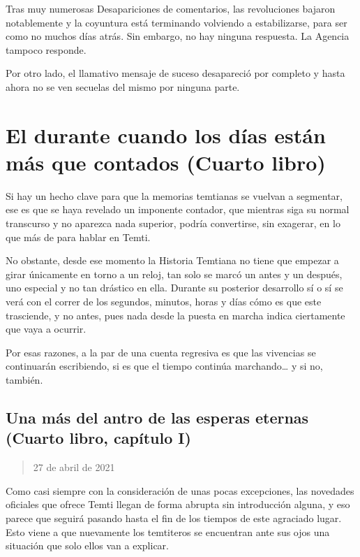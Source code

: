 \documentclass[
  spanish,
]{book}
\begin{document}
Tras muy numerosas Desapariciones de comentarios, las revoluciones bajaron notablemente y la coyuntura está terminando volviendo a estabilizarse, para ser como no muchos días atrás. Sin embargo, no hay ninguna respuesta. La Agencia tampoco responde.

Por otro lado, el llamativo mensaje de suceso desapareció por completo y hasta ahora no se ven secuelas del mismo por ninguna parte.

\hypertarget{el-durante-cuando-los-duxedas-estuxe1n-muxe1s-que-contados-cuarto-libro}{%
\chapter{El durante cuando los días están más que contados (Cuarto libro)}\label{el-durante-cuando-los-duxedas-estuxe1n-muxe1s-que-contados-cuarto-libro}}

Si hay un hecho clave para que la memorias temtianas se vuelvan a segmentar, ese es que se haya revelado un imponente contador, que mientras siga su normal transcurso y no aparezca nada superior, podría convertirse, sin exagerar, en lo que más de para hablar en Temti.

No obstante, desde ese momento la Historia Temtiana no tiene que empezar a girar únicamente en torno a un reloj, tan solo se marcó un antes y un después, uno especial y no tan drástico en ella. Durante su posterior desarrollo sí o sí se verá con el correr de los segundos, minutos, horas y días cómo es que este trasciende, y no antes, pues nada desde la puesta en marcha indica ciertamente que vaya a ocurrir.

Por esas razones, a la par de una cuenta regresiva es que las vivencias se continuarán escribiendo, si es que el tiempo continúa marchando\ldots{} y si no, también.

\hypertarget{una-muxe1s-del-antro-de-las-esperas-eternas-cuarto-libro-capuxedtulo-i}{%
\section{Una más del antro de las esperas eternas (Cuarto libro, capítulo I)}\label{una-muxe1s-del-antro-de-las-esperas-eternas-cuarto-libro-capuxedtulo-i}}

\begin{quote}
27 de abril de 2021
\end{quote}

Como casi siempre con la consideración de unas pocas excepciones, las novedades oficiales que ofrece Temti llegan de forma abrupta sin introducción alguna, y eso parece que seguirá pasando hasta el fin de los tiempos de este agraciado lugar. Esto viene a que nuevamente los temtiteros se encuentran ante sus ojos una situación que solo ellos van a explicar.
\end{document}
